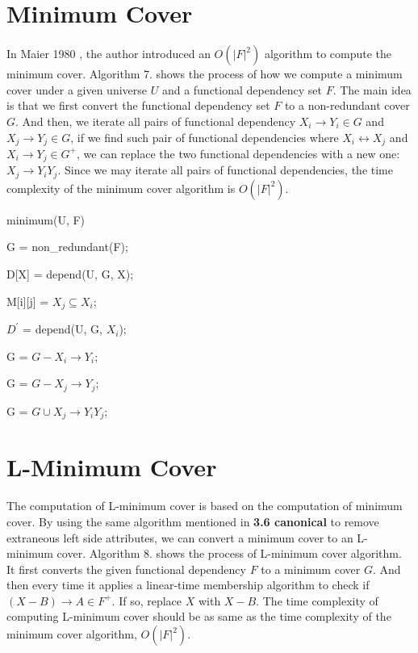 \documentclass[11pt]{book}
\begin{document}
\section{Minimum Cover}

In Maier 1980 \cite{maier1980minimum}, the author introduced an $O(|F|^2)$ algorithm to compute the minimum cover. Algorithm 7. shows the process of how we compute a minimum cover under a given universe $U$ and a functional dependency set $F$. The main idea is that we first convert the functional dependency set $F$ to a non-redundant cover $G$. And then, we iterate all pairs of functional dependency $X_i \rightarrow Y_i \in G$ and $X_j \rightarrow Y_j \in G$, if we find such pair of functional dependencies where $X_i \leftrightarrow X_j$ and $X_i \rightarrow Y_j \in G^{+}$, we can replace the two functional dependencies with a new one: $X_j \rightarrow Y_iY_j$. Since we may iterate all pairs of functional dependencies, the time complexity of the minimum cover algorithm is $O(|F|^2)$.

\begin{algorithm}
  \caption{minimum(U, F)}
  
  \SetAlgoLined
  
  G = non\_redundant(F);
  
   {
  	D[X] = depend(U, G, X);
  }
  
   {
  	 {
  	  M[i][j] = $X_j \subseteq X_i$;  	
  	}
  }
  
   {
    $D^{'}$ = depend(U, G, $X_i$);
    
     {
       {
      	G = $G - {X_i \rightarrow Y_i}$;
      	
      	G = $G - {X_j \rightarrow Y_j}$;

      	G = $G \cup {X_j \rightarrow Y_iY_j}$;
      }
    }    
  }
\end{algorithm}

\section{L-Minimum Cover}

The computation of L-minimum cover is based on the computation of minimum cover. By using the same algorithm \cite{beeri1979computational} mentioned in \textbf{3.6 canonical} to remove extraneous left side attributes, we can convert a minimum cover to an L-minimum cover. Algorithm 8. shows the process of L-minimum cover algorithm. It first converts the given functional dependency $F$ to a minimum cover $G$. And then every time it applies a linear-time membership algorithm to check if $(X - B) \rightarrow A \in F^{+}$. If so, replace $X$ with $X - B$. The time complexity of computing L-minimum cover should be as same as the time complexity of the minimum cover algorithm, $O(|F|^2)$.
\end{document}
